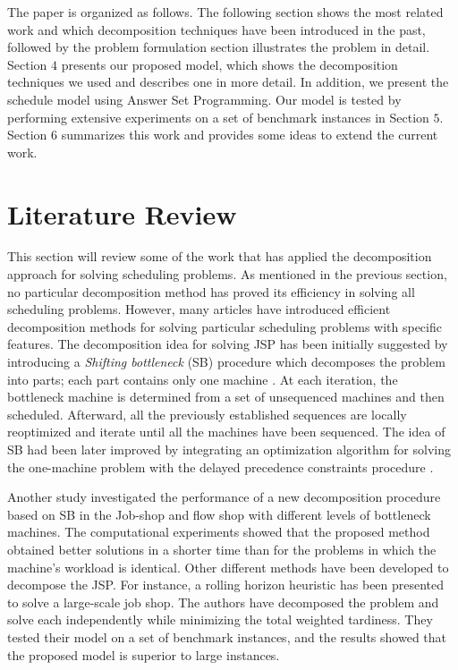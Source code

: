 \documentclass{tlp} %
\begin{document}
The paper is organized as follows. The following section shows the most related work and which decomposition techniques have been introduced in the past, followed by the problem formulation section illustrates the problem in detail. Section $4$ presents our proposed model, which shows the decomposition techniques we used and describes one in more detail. In addition, we present the schedule model using Answer Set Programming. Our model is tested by performing extensive experiments on a set of benchmark instances in Section $5$. Section $6$ summarizes this work and provides some ideas to extend the current work.

\section{Literature Review}
This section will review some of the work that has applied the decomposition approach for solving scheduling problems. As mentioned in the previous section, no particular decomposition method has proved its efficiency in solving all scheduling problems. However, many articles have introduced efficient decomposition methods for solving particular scheduling problems with specific features. The decomposition idea for solving JSP has been initially suggested by introducing a \textit{Shifting bottleneck} (SB) procedure which decomposes the problem into parts; each part contains only one machine \cite{adams1988shifting}. At each iteration, the bottleneck machine is determined from a set of unsequenced machines and then scheduled. Afterward, all the previously established sequences are locally reoptimized and iterate until all the machines have been sequenced. The idea of SB had been later improved by integrating an optimization algorithm for solving the one-machine problem with the delayed precedence constraints procedure \cite{balas1995one}.

Another study investigated the performance of a new decomposition procedure based on SB in the Job-shop and flow shop with different levels of bottleneck machines. The computational experiments showed that the proposed method obtained better solutions in a shorter time than for the problems in which the machine's workload is identical. Other different methods have been developed to decompose the JSP. For instance, a rolling horizon heuristic has been presented \cite{singer2001decomposition} to solve a large-scale job shop. The authors have decomposed the problem and solve each independently while minimizing the total weighted tardiness. They tested their model on a set of benchmark instances, and the results showed that the proposed model is superior to large instances. 
\end{document}
